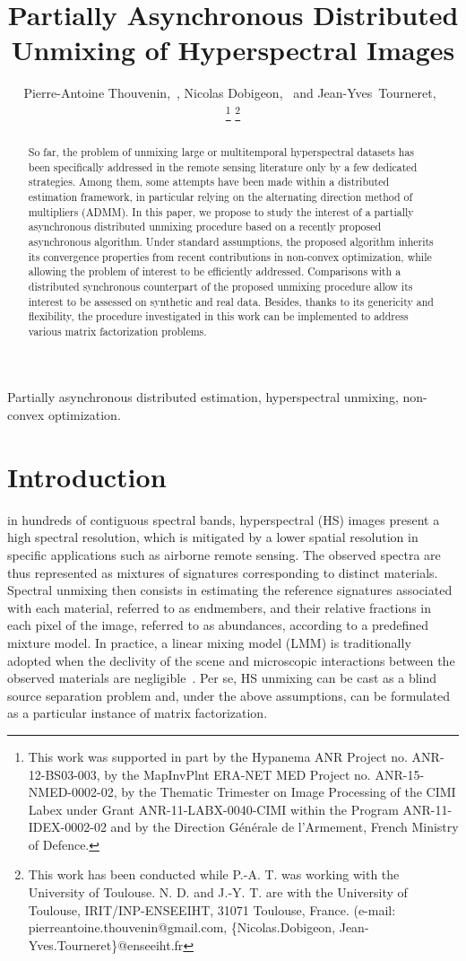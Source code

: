 \documentclass[journal,final,letterpaper,twoside,twocolumn]{IEEEtran}
\title{Partially Asynchronous Distributed Unmixing of Hyperspectral Images}
\author{Pierre-Antoine Thouvenin,~\IEEEmembership{Member,~IEEE}, Nicolas Dobigeon,~\IEEEmembership{Senior Member,~IEEE} and Jean-Yves~Tourneret,~\IEEEmembership{Senior Member,~IEEE}

\thanks{This work was supported in part by the Hypanema ANR Project no. ANR-12-BS03-003, by the MapInvPlnt ERA-NET MED Project no. ANR-15-NMED-0002-02, by the Thematic Trimester on Image Processing of the CIMI Labex under Grant ANR-11-LABX-0040-CIMI within the Program ANR-11-IDEX-0002-02 and by the Direction G{\'e}n{\'e}rale de l'Armement, French Ministry of Defence.}
\thanks{This work has been conducted while P.-A. T. was working with the University of Toulouse. N. D. and J.-Y. T. are with the University of Toulouse, IRIT/INP-ENSEEIHT, 31071 Toulouse, France. (e-mail: pierreantoine.thouvenin@gmail.com, \{Nicolas.Dobigeon, Jean-Yves.Tourneret\}@enseeiht.fr}}
\begin{document}
\setlength{\textfloatsep}{4pt}
\setlength{\intextsep}{4pt}
\setlength{\abovedisplayskip}{5pt}
\setlength{\belowdisplayskip}{5pt}
%
\maketitle
%
\begin{abstract} %
So far, the problem of unmixing large or multitemporal hyperspectral datasets has been specifically addressed in the remote sensing literature only by a few dedicated strategies. Among them, some attempts have been made within a distributed estimation framework, in particular relying on the alternating direction method of multipliers (ADMM). In this paper, we propose to study the interest of a partially asynchronous distributed unmixing procedure based on a recently proposed asynchronous algorithm. Under standard assumptions, the proposed algorithm inherits its convergence properties from recent contributions in non-convex optimization, while allowing the problem of interest to be efficiently addressed. Comparisons with a distributed synchronous counterpart of the proposed unmixing procedure allow its interest to be assessed on synthetic and real data. Besides, thanks to its genericity and flexibility, the procedure investigated in this work can be implemented to address various matrix factorization problems.
\end{abstract}
%
\begin{IEEEkeywords}
Partially asynchronous distributed estimation, hyperspectral unmixing, non-convex optimization.
\end{IEEEkeywords}

\section{Introduction} \label{sec:intro}

 in hundreds of contiguous spectral bands, hyperspectral (HS) images present a high spectral resolution, which is mitigated by a lower spatial resolution in specific applications such as airborne remote sensing. The observed spectra are thus represented as mixtures of signatures corresponding to distinct materials. Spectral unmixing then consists in estimating the reference signatures associated with each material, referred to as endmembers, and their relative fractions in each pixel of the image, referred to as abundances, according to a predefined mixture model. In practice, a linear mixing model (LMM) is traditionally adopted when the declivity of the scene and microscopic interactions between the observed materials are negligible~\cite{Bioucas2012jstars}. Per se, HS unmixing can be cast as a blind source separation problem and, under the above assumptions, can be formulated as a particular instance of matrix factorization.
\end{document}
